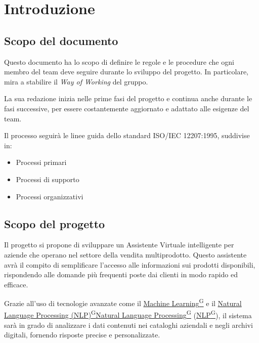 \section{Introduzione}

\subsection{Scopo del documento}
Questo documento ha lo scopo di definire le regole e le procedure che ogni membro del team deve seguire durante 
lo sviluppo del progetto. In particolare, mira a stabilire il \textit{Way of Working} del gruppo. 

La sua redazione inizia nelle prime fasi del progetto e continua anche durante le fasi successive, 
per essere costantemente aggiornato e adattato alle esigenze del team. 

Il processo seguirà le linee guida dello standard ISO/IEC 12207:1995, suddivise in:
\begin{itemize}
    \item Processi primari
    \item Processi di supporto
    \item Processi organizzativi
\end{itemize}


\subsection{Scopo del progetto}
Il progetto si propone di sviluppare un Assistente Virtuale intelligente per aziende che operano nel 
settore della vendita multiprodotto. Questo assistente avrà il compito di semplificare l'accesso alle 
informazioni sui prodotti disponibili, rispondendo alle domande più frequenti poste dai clienti in modo rapido ed efficace.

Grazie all'uso di tecnologie avanzate come il \href{https://code7crusaders.github.io/docs/RTB/documentazione_interna/glossario.html#machine-learning}{Machine Learning\textsuperscript{G}} e il \href{https://code7crusaders.github.io/docs/RTB/documentazione_interna/glossario.html#natural-language-processing-nlp}{Natural Language Processing (NLP)\textsuperscript{G}}\href{https://code7crusaders.github.io/docs/RTB/documentazione_interna/glossario.html#natural-language-processing-nlp}{Natural Language Processing\textsuperscript{G}} (\href{https://code7crusaders.github.io/docs/RTB/documentazione_interna/glossario.html#natural-language-processing-nlp}{NLP\textsuperscript{G}}), 
il sistema sarà in grado di analizzare i dati contenuti nei cataloghi aziendali e negli archivi digitali, 
fornendo risposte precise e personalizzate.

